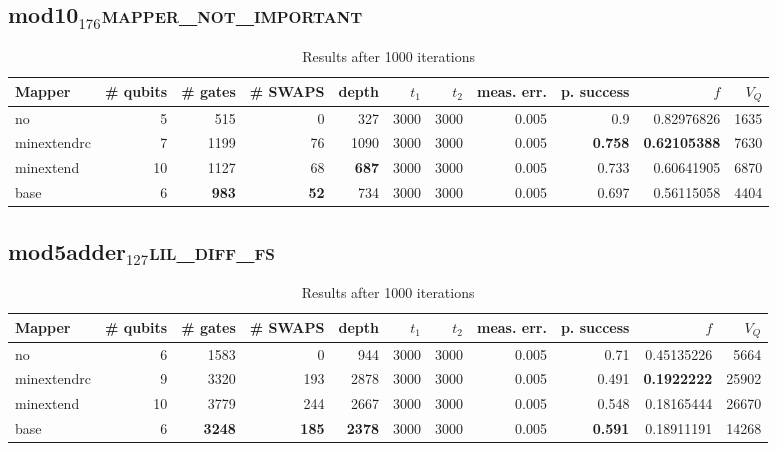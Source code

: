 \documentclass[11pt]{article}
\begin{document}
\subsection{mod10\(_{\text{176}}\)\hfill{}\textsc{mapper\_not\_important}}
\label{sec:orgf61ce5d}
\begin{table}[H]
\caption{\label{tab:orgae31dbf}
Results after 1000 iterations}
\centering
\small
\begin{tabular}{lrrrrrrrrrr}
\hline
Mapper & \# qubits & \# gates & \# SWAPS & depth & \(t_1\) & \(t_2\) & meas. err. & p. success & \(f\) & \(V_Q\)\\
\hline
no & 5 & 515 & 0 & 327 & 3000 & 3000 & 0.005 & 0.9 & 0.82976826 & 1635\\
\hline
minextendrc & 7 & 1199 & 76 & 1090 & 3000 & 3000 & 0.005 & \textbf{0.758} & \textbf{0.62105388} & 7630\\
minextend & 10 & 1127 & 68 & \textbf{687} & 3000 & 3000 & 0.005 & 0.733 & 0.60641905 & 6870\\
base & 6 & \textbf{983} & \textbf{52} & 734 & 3000 & 3000 & 0.005 & 0.697 & 0.56115058 & 4404\\
\hline
\end{tabular}
\end{table}
\subsection{mod5adder\(_{\text{127}}\)\hfill{}\textsc{lil\_diff\_fs}}
\label{sec:orgdaa8d02}
\begin{table}[H]
\caption{\label{tab:org68e482f}
Results after 1000 iterations}
\centering
\small
\begin{tabular}{lrrrrrrrrrr}
\hline
Mapper & \# qubits & \# gates & \# SWAPS & depth & \(t_1\) & \(t_2\) & meas. err. & p. success & \(f\) & \(V_Q\)\\
\hline
no & 6 & 1583 & 0 & 944 & 3000 & 3000 & 0.005 & 0.71 & 0.45135226 & 5664\\
\hline
minextendrc & 9 & 3320 & 193 & 2878 & 3000 & 3000 & 0.005 & 0.491 & \textbf{0.1922222} & 25902\\
minextend & 10 & 3779 & 244 & 2667 & 3000 & 3000 & 0.005 & 0.548 & 0.18165444 & 26670\\
base & 6 & \textbf{3248} & \textbf{185} & \textbf{2378} & 3000 & 3000 & 0.005 & \textbf{0.591} & 0.18911191 & 14268\\
\hline
\end{tabular}
\end{table}
\end{document}
